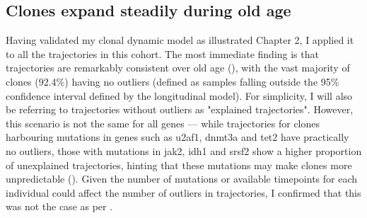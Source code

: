 \begin{figure}[!ht]
	\label{fig:ch-mutations-per-gene}
\end{figure}

\subsection{Clones expand steadily during old age}

Having validated my clonal dynamic model as illustrated Chapter 2, I applied it to all the trajectories in this cohort. The most immediate finding is that trajectories are remarkably consistent over old age (), with the vast majority of clones (92.4\%) having no outliers (defined as samples falling outside the 95\% confidence interval defined by the longitudinal model). For simplicity, I will also be referring to trajectories without outliers as "explained trajectories". However, this scenario is not the same for all genes --- while trajectories for clones harbouring mutations in genes such as \ac{u2af1}, \ac{dnmt3a} and \ac{tet2} have practically no outliers, those with mutations in \ac{jak2}, \ac{idh1} and \ac{srsf2} show a higher proportion of unexplained trajectories, hinting that these mutations may make clones more unpredictable (). Given the number of mutations or available timepoints for each individual could affect the number of outliers in trajectories, I confirmed that this was not the case as per . 

\begin{figure}[!ht]
	\label{fig:ch-trajectories-examples}
\end{figure}

\begin{figure}[!ht]
	\label{fig:ch-trajectories-explained-gene}
\end{figure}

